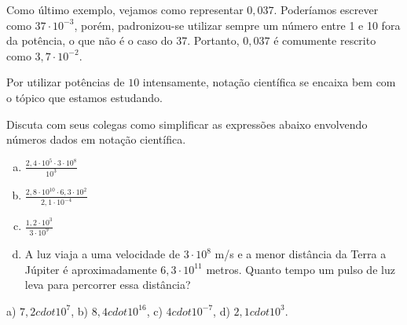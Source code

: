\documentclass[main.tex]{subfiles}
\begin{document}
Como último exemplo, vejamos como representar $0,037$. Poderíamos escrever como $37 \cdot 10^{-3}$, porém, padronizou-se utilizar sempre um número entre 1 e 10 fora da potência, o que não é o caso do 37. Portanto, $0,037$ é comumente rescrito como $3,7 \cdot 10^{-2}$.

Por utilizar potências de $10$ intensamente, notação científica se encaixa bem com o tópico que estamos estudando.

\begin{questao}
 Discuta com seus colegas como simplificar as expressões abaixo envolvendo números dados em notação científica.
\begin{enumerate}[a)]
\item $\frac{2,4  \cdot 10^5 \cdot 3  \cdot 10^8}{10^3}$
\item $\frac{2,8  \cdot 10^{10} \cdot 6,3  \cdot 10^2}{2,1 \cdot 10^{-4}}$
\item $\frac{1,2  \cdot 10^3}{3 \cdot 10^9}$
\item A luz viaja a uma velocidade de $3 \cdot 10^8$ m/s e a menor distância da Terra a Júpiter é aproximadamente $6,3 \cdot 10^{11}$ metros. Quanto tempo um pulso de luz leva para percorrer essa distância?
\end{enumerate}
\end{questao}

\begin{gabarito}
	\begin{gabaritoQuestao}
		a) $7,2 cdot 10^{7}$, b) $8,4 cdot 10^{16}$, c) $4 cdot 10^{-7}$, d) $2,1 cdot 10^{3}$.
	\end{gabaritoQuestao}
\end{gabarito}
\end{document}
